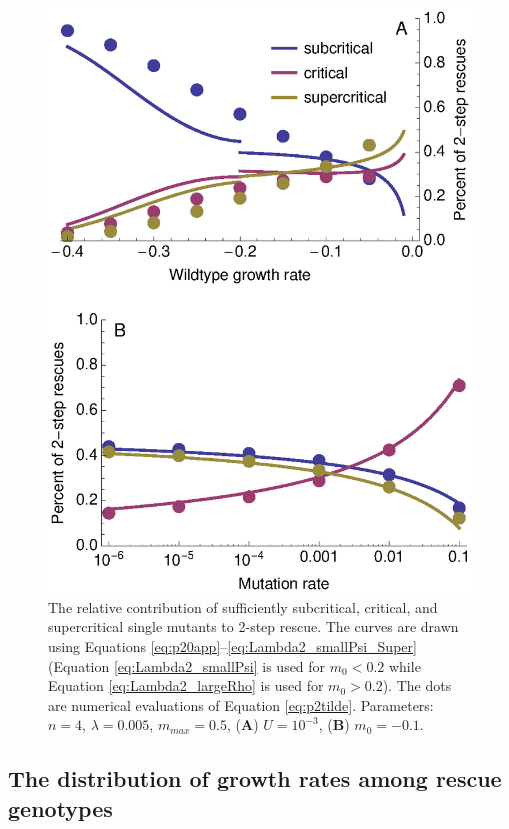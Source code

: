 \documentclass[9pt,twocolumn,twoside,lineno]{gsajnl}
\begin{document}
\begin{figure}[htb]
\centering
\includegraphics[width=\linewidth]{Figure5.eps}
\caption{
The relative contribution of sufficiently subcritical, critical, and supercritical single mutants to 2-step rescue.
The curves are drawn using Equations \ref{eq:p20app}--\ref{eq:Lambda2_smallPsi_Super} (Equation \ref{eq:Lambda2_smallPsi} is used for $m_0<0.2$ while Equation \ref{eq:Lambda2_largeRho} is used for $m_0>0.2$).
The dots are numerical evaluations of Equation \ref{eq:p2tilde}.
Parameters: $n=4$, $\lambda=0.005$, $m_{max}=0.5$, (\textbf{A}) $U=10^{-3}$, (\textbf{B}) $m_0 = -0.1$.
}%
\label{fig:2stepstyle}
\end{figure}

\subsection{The distribution of growth rates among rescue genotypes}
\end{document}
